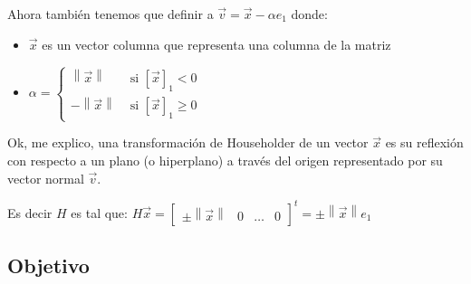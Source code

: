 \documentclass[12pt, fleqn]{report}                             %
\theoremstyle{break}                                            %
\newcommand{\Abs}[1]    {\left\lVert #1 \right\lVert}           %
\newcommand{\bVector}[1]                                        %
        { \ensuremath{\begin{bmatrix}#1\end{bmatrix}} }             %
\begin{document}
            Ahora también tenemos que definir a $\vec v = \vec x - \alpha e_1$ donde:
            \begin{itemize}
                \item $\vec x$ es un vector columna que representa una columna de la matriz
            \item $
                    \alpha = 
                        \begin{cases}
                            \Abs{\vec x} & \text{ si } [\vec x]_1 < 0       \\
                            - \Abs{\vec x} & \text{ si } [\vec x]_1 \geq 0    
                        \end{cases}
                $
            \end{itemize}

            Ok, me explico, una transformación de Householder de un vector $\vec x$ es su reflexión
            con respecto a un plano (o hiperplano) a través del origen representado por su vector normal
            $\vec v$.

            Es decir $H$ es tal que: 
            $H \vec x = \bVector{\pm \Abs{\vec x} & 0 & \dots & 0}^t = \pm \Abs{\vec x} e_1$

            \subsection{Objetivo}
\end{document}
